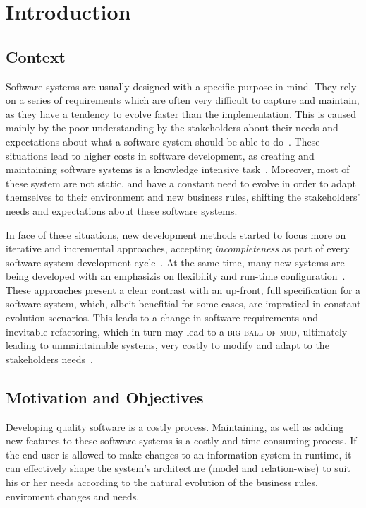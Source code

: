 \chapter{Introduction}\label{chap:intro}

\section{Context}\label{sec:context}

Software systems are usually designed with a specific purpose in mind. They rely on a series of requirements which are often very difficult to capture and maintain, as they have a tendency to evolve faster than the implementation. This is caused mainly by the poor understanding by the stakeholders about their needs and expectations about what a software system should be able to do~\cite{PT07}. These situations lead to higher costs in software development, as creating and maintaining software systems is a knowledge intensive task~\cite{AdOdSBD07}. Moreover, most of these system are not static, and have a constant need to evolve in order to adapt themselves to their environment and new business rules, shifting the stakeholders' needs and expectations about these software systems.

In face of these situations, new development methods started to focus more on iterative and incremental approaches, accepting \textit{incompleteness} as part of every software system development cycle~\cite{WC03}. At the same time, many new systems are being developed with an emphasizis on flexibility and run-time configuration~\cite{YJ02}. These approaches present a clear contrast with an up-front, full specification for a software system, which, albeit benefitial for some cases, are impratical in constant evolution scenarios. This leads to a change in software requirements and inevitable refactoring, which in turn may lead to a \textsc{big ball of mud}, ultimately leading to unmaintainable systems, very costly to modify and adapt to the stakeholders needs~\cite{FY97}.

\section{Motivation and Objectives}\label{sec:goals}

Developing quality software is a costly process. Maintaining, as well as adding new features to these software systems is a costly and time-consuming process. If the end-user is allowed to make changes to an information system in runtime, it can effectively shape the system's architecture (model and relation-wise) to suit his or her needs according to the natural evolution of the business rules, enviroment changes and needs.

